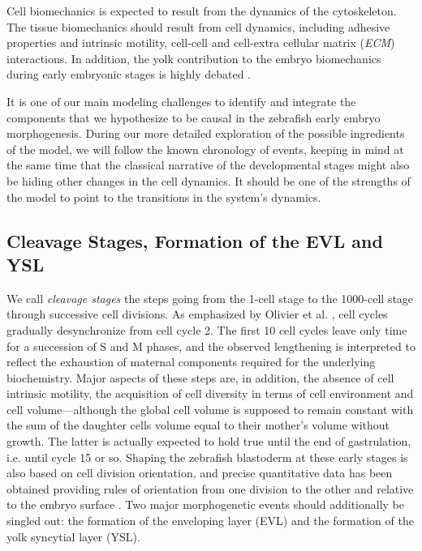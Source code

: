 Cell biomechanics is expected to result from the dynamics of the cytoskeleton. The tissue biomechanics should result from cell dynamics, including adhesive properties and intrinsic motility, cell-cell and cell-extra cellular matrix (\textit{ECM}) interactions. In addition, the yolk contribution to the embryo biomechanics during early embryonic stages is highly debated \cite{Behrndt:2012gy}.  

It is one of our main  modeling challenges to identify and integrate the components that we hypothesize to be causal in the zebrafish early embryo morphogenesis. During our more detailed exploration of the possible ingredients of the model, we will follow the known chronology of events, keeping in mind at the same time that the classical narrative of the developmental stages might also be hiding other changes in the cell dynamics. It should be one of the strengths of the model to point to the transitions in the system's dynamics.


\subsection{Cleavage Stages, Formation of the EVL and YSL}


We call \textit{cleavage stages} the steps going from the 1-cell stage to the 1000-cell stage through successive cell divisions. As emphasized by Olivier et al. \cite{Olivier:2010jz}, cell cycles gradually desynchronize from cell cycle 2. The first 10 cell cycles leave only time for a succession of S and M phases, and the observed lengthening is interpreted to reflect the exhaustion of maternal components required for the underlying biochemistry. Major aspects of these steps are, in addition, the absence of cell intrinsic motility, the acquisition of cell diversity in terms of cell environment and cell volume---although the global cell volume is supposed to remain constant with the sum of the daughter cells volume equal to their mother's volume without growth. The latter is actually expected to hold true until the end of gastrulation, i.e. until cycle 15 or so. Shaping the zebrafish blastoderm at these early stages is also based on cell division orientation, and precise quantitative data has been obtained providing rules of orientation from one division to the other and relative to the embryo surface \cite{Olivier:2010jz}. Two major morphogenetic events should additionally be singled out: the formation of the enveloping layer (EVL) and the formation of the yolk syncytial layer (YSL).


